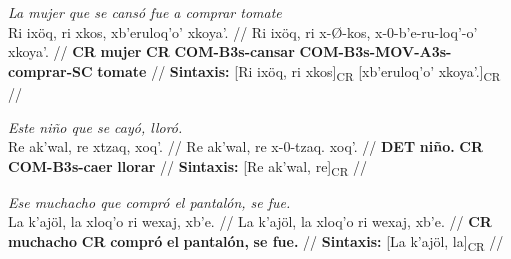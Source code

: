 \documentclass{article}%
\begin{document}
%
\par\medskip%
\ex
\textit{La mujer que se cansó fue a comprar tomate} \\
\begingl
\gla Ri ixöq, ri xkos, xb'eruloq'o' xkoya'. //
\glb Ri ixöq, ri x-Ø-kos, x-0-b'e-ru-loq'-o' xkoya'. //
\glc \textbf{CR} \textbf{mujer} \textbf{CR} \textbf{COM-}\textbf{B3s-}\textbf{cansar} \textbf{COM-}\textbf{B3s-}\textbf{MOV-}\textbf{A3s-}\textbf{comprar-}\textbf{SC} \textbf{tomate} //
\glft \textbf{Sintaxis:} [Ri ixöq, ri xkos]\textsubscript{CR} [xb'eruloq'o' xkoya'.]\textsubscript{CR} //
\endgl
\xe
%
\medskip%
\par\medskip%
\ex
\textit{Este niño que se cayó, lloró.} \\
\begingl
\gla Re ak'wal, re xtzaq, xoq'. //
\glb Re ak'wal, re x-0-tzaq. xoq'. //
\glc \textbf{DET} \textbf{niño.} \textbf{CR} \textbf{COM-}\textbf{B3s-}\textbf{caer} \textbf{llorar} //
\glft \textbf{Sintaxis:} [Re ak'wal, re]\textsubscript{CR} //
\endgl
\xe
%
\medskip%
\par\medskip%
\ex
\textit{Ese muchacho que compró el pantalón, se fue.} \\
\begingl
\gla La k'ajöl, la xloq'o ri wexaj, xb'e. //
\glb La k'ajöl, la xloq'o ri wexaj, xb'e. //
\glc \textbf{CR} \textbf{muchacho} \textbf{CR} \textbf{compró} \textbf{el} \textbf{pantalón,} \textbf{se fue.} //
\glft \textbf{Sintaxis:} [La k'ajöl, la]\textsubscript{CR} //
\endgl
\xe
%
\medskip

%
\end{document}
